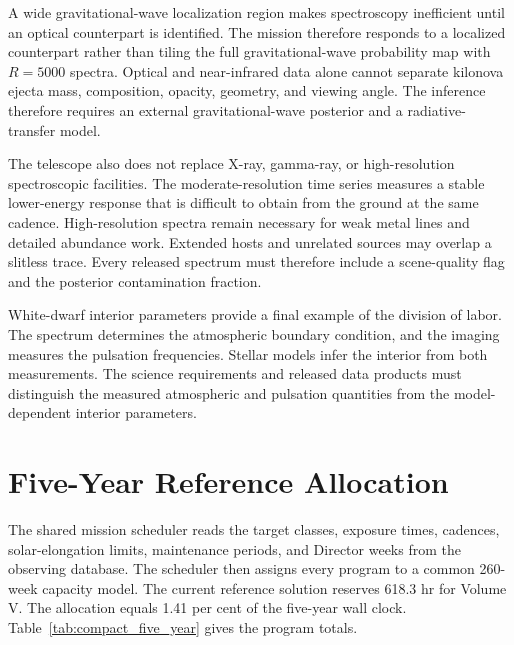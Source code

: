 \documentclass[10pt,onecolumn]{article}
\begin{document}
A wide gravitational-wave localization region makes spectroscopy inefficient
until an optical counterpart is identified. The mission therefore responds to
a localized counterpart rather than tiling the full gravitational-wave
probability map with $R=5000$ spectra. Optical and near-infrared data alone
cannot separate kilonova ejecta mass, composition, opacity, geometry, and
viewing angle. The inference therefore requires an external
gravitational-wave posterior and a radiative-transfer model.

The telescope also does not replace X-ray, gamma-ray, or high-resolution
spectroscopic facilities. The moderate-resolution time series measures a
stable lower-energy response that is difficult to obtain from the ground at
the same cadence. High-resolution spectra remain necessary for weak metal
lines and detailed abundance work. Extended hosts and unrelated sources may
overlap a slitless trace. Every released spectrum must therefore include a
scene-quality flag and the posterior contamination fraction.

White-dwarf interior parameters provide a final example of the division of
labor. The spectrum determines the atmospheric boundary condition, and the
imaging measures the pulsation frequencies. Stellar models infer the interior
from both measurements. The science requirements and released data products
must distinguish the measured atmospheric and pulsation quantities from the
model-dependent interior parameters.

\section{Five-Year Reference Allocation}
\label{sec:compact_schedule}

The shared mission scheduler reads the target classes, exposure times,
cadences, solar-elongation limits, maintenance periods, and Director weeks
from the observing database. The scheduler then assigns every program to a
common 260-week capacity model. The current reference solution reserves 618.3 hr for
Volume V. The allocation equals 1.41 per cent of the five-year wall clock.
Table~\ref{tab:compact_five_year} gives the program totals.
\end{document}
